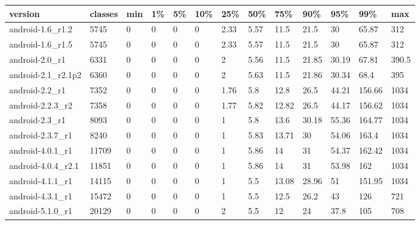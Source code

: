 \begin{tabular}{|l|l|l|l|l|l|l|l|l|l|l|l|l|}
\hline
version&classes&min&1\%&5\%&10\%&25\%&50\%&75\%&90\%&95\%&99\%&max\\
\hline
android-1.6\_r1.2&5745&0&0&0&0&2.33&5.57&11.5&21.5&30&65.87&312\\
\hline
android-1.6\_r1.5&5745&0&0&0&0&2.33&5.57&11.5&21.5&30&65.87&312\\
\hline
android-2.0\_r1&6331&0&0&0&0&2&5.56&11.5&21.85&30.19&67.81&390.5\\
\hline
android-2.1\_r2.1p2&6360&0&0&0&0&2&5.63&11.5&21.86&30.34&68.4&395\\
\hline
android-2.2\_r1&7352&0&0&0&0&1.76&5.8&12.8&26.5&44.21&156.66&1034\\
\hline
android-2.2.3\_r2&7358&0&0&0&0&1.77&5.82&12.82&26.5&44.17&156.62&1034\\
\hline
android-2.3\_r1&8093&0&0&0&0&1&5.8&13.6&30.18&55.36&164.77&1034\\
\hline
android-2.3.7\_r1&8240&0&0&0&0&1&5.83&13.71&30&54.06&163.4&1034\\
\hline
android-4.0.1\_r1&11709&0&0&0&0&1&5.86&14&31&54.37&162.42&1034\\
\hline
android-4.0.4\_r2.1&11851&0&0&0&0&1&5.86&14&31&53.98&162&1034\\
\hline
android-4.1.1\_r1&14115&0&0&0&0&1&5.5&13.08&28.96&51&151.95&1034\\
\hline
android-4.3.1\_r1&15472&0&0&0&0&1&5.5&12.5&26.2&43&126&721\\
\hline
android-5.1.0\_r1&20129&0&0&0&0&2&5.5&12&24&37.8&105&708\\
\hline
\end{tabular}
